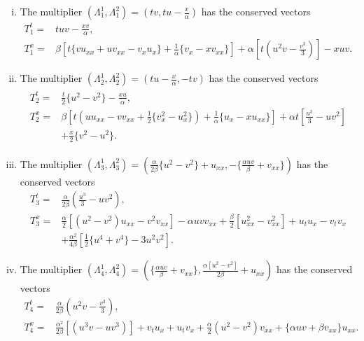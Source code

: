\begin{enumerate}[(i)]
	\item The multiplier $ \left( \Lambda_{1}^1, \Lambda_{1}^2\right)= \left( tv,tu-\frac{x}{ \alpha}\right)$ has the  conserved vectors 
\begin{align}
T_1^t=& tuv-\frac{xv}{\alpha},\\
T_1^x=& \beta \left[ t\{vu_{xx} +uv_{xx} -v_x u_x \}   + \frac{1}{\alpha}\{v_x-xv_{xx}\} \right]+ \alpha \left[ t \left( u^2v-\frac{v^3}{3}\right) \right] -xuv.
\end{align}

\item The multiplier $ \left( \Lambda_{2}^1, \Lambda_{2}^2\right)= \left( tu-\frac{x}{ \alpha},-tv\right)$ has the  conserved vectors 
\begin{align} \begin{aligned}
T_2^t=& \frac{ t}{2} \{u^2-v^2  \} -\frac{xu}{ \alpha},\\
T_2^x=& \beta\left[t \left( uu_{xx}-vv_{xx} + \frac{ 1}{2} \{v_x^2-u_x^2 \} \right) +  \frac{1}{\alpha}\{u_x-xu_{xx} \}   \right] + \alpha t \left[ \frac{u^3}{3} -uv^2 \right]\\ & + \frac{x}{2} \{v^2-u^2 \}.\end{aligned}
\end{align}

\item  The multiplier $ \left( \Lambda_{3}^1, \Lambda_{3}^2\right)= \left(  \frac{ \alpha }{2 \beta} \{u^2- v^2 \}+ u_{xx},  -\{ \frac{ \alpha uv}{\beta} +v_{xx}\} \right)$ has the  conserved vectors 
\begin{align}
T_3^t=& \frac{\alpha }{2 \beta}
\left( \frac{u^3}{3}-uv^2\right),\\
T_3^x=& \frac{\alpha}{2} \left[ (u^2-v^2)u_{xx} -v^2v_{xx} \right] - \alpha u v v_{xx}+ \frac{\beta}{2} \left[ u_{xx}^2-v_{xx}^2\right]+ u_tu_x-v_tv_x \\& + \frac{ \alpha^2}{4 \beta} \left[ \frac{1}{2} \{ u^4+v^4 \}-3u^2v^2 \right].
\end{align}
\item  The multiplier $ \left( \Lambda_{4}^1, \Lambda_{4}^2\right)= \left( \{ \frac{ \alpha uv}{\beta} +v_{xx}\} ,  \frac{ \alpha [u^2- v^2 ] }{2 \beta}+ u_{xx}\right)$ has the  conserved vectors 
\begin{align}
T_4^t=& \frac{\alpha }{2 \beta}
\left(u^2v - \frac{v^3}{3}\right),\\
T_4^x=& \frac{ \alpha^2}{ 2 \beta} \left[  ( u^3v-uv^3)\right]+ v_tu_x + u_tv_x+ \frac{\alpha}{2} (u^2-v^2)v_{xx} + \{\alpha uv + \beta v_{xx} \}u_{xx}.
\end{align}


\end{enumerate}
